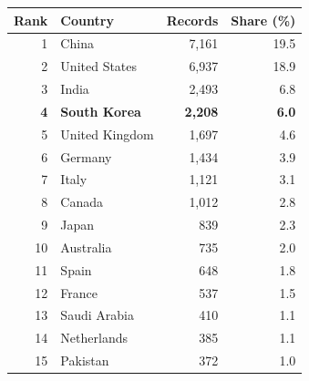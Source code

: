 \begin{tabular}{rlrr}
\toprule
Rank & Country & Records & Share (\%) \\
\midrule
1 & China & 7,161 & 19.5 \\
2 & United States & 6,937 & 18.9 \\
3 & India & 2,493 & 6.8 \\
\bfseries 4 & \bfseries South Korea & \bfseries 2,208 & \bfseries 6.0 \\
5 & United Kingdom & 1,697 & 4.6 \\
6 & Germany & 1,434 & 3.9 \\
7 & Italy & 1,121 & 3.1 \\
8 & Canada & 1,012 & 2.8 \\
9 & Japan & 839 & 2.3 \\
10 & Australia & 735 & 2.0 \\
11 & Spain & 648 & 1.8 \\
12 & France & 537 & 1.5 \\
13 & Saudi Arabia & 410 & 1.1 \\
14 & Netherlands & 385 & 1.1 \\
15 & Pakistan & 372 & 1.0 \\
\bottomrule
\end{tabular}
